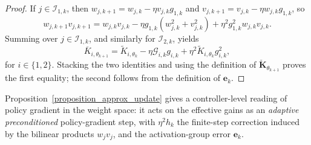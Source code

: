 \documentclass[letterpaper, 10 pt, conference]{ieeeconf}
\newcommand{\be}{\mathbf{e}}
\newcommand{\bK}{\mathbf{K}}
\newcommand{\cG}{\mathcal{G}}
\newcommand{\sI}{\mathscr{I}}
\newcommand{\Prop}{Proposition}
\begin{document}
\begin{proof}
    If $j \in \sI_{1,k}$, then $w_{j,k+1} = w_{j,k} - \eta v_{j,k} g_{1,k}$ and $v_{j,k+1} = v_{j,k} - \eta w_{j,k} g_{1,k}$, so
    \begin{equation}
            w_{j,k+1} v_{j,k+1}
            {=}
            w_{j,k} v_{j,k}
            {-} \eta g_{1,k}(w_{j,k}^{2} {+} v_{j,k}^{2})
            {+} \eta^{2} g_{1,k}^{2} w_{j,k} v_{j,k}.
    \end{equation}
    Summing over $j \in \sI_{1,k}$, and similarly for $\sI_{2,k}$, yields
    \begin{equation}
        \overline{K}_{i, \theta_{k+1}}
        =
        \widetilde{K}_{i,\theta_k}
        -\eta \cG_{i,k} g_{i,k}
        +\eta^2 \widetilde{K}_{i,\theta_k} g_{i,k}^2,
    \end{equation}
    for $i \in \{1,2\}$. Stacking the two identities and using the definition of $\check{\bK}_{\theta_{k+1}}$ proves the first equality; the second follows from the definition of $\be_{k}$.
\end{proof}
 
\Prop~\ref{proposition_approx_update} gives a controller-level reading of policy gradient in the weight space: it acts on the effective gains as an \emph{adaptive preconditioned} policy-gradient step, with $\eta^{2}h_{k}$ the finite-step correction induced by the bilinear products $w_{j}v_{j}$, and the activation-group error $\be_{k}$.
 
\end{document}
